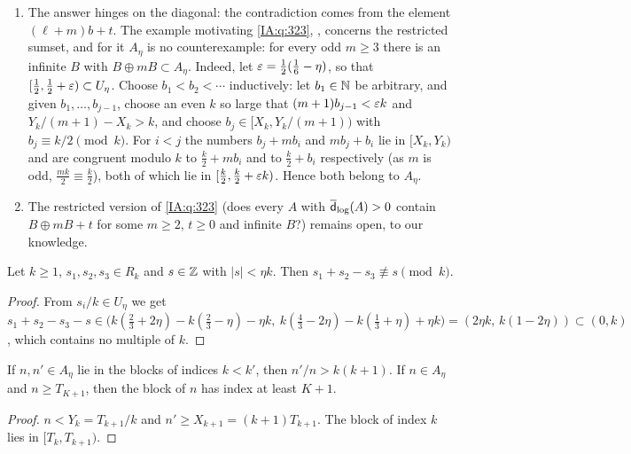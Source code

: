 \begin{remark}\label{IA:rem:323}
\begin{enumerate}[label=(\roman*)]
\item The answer hinges on the diagonal: the contradiction comes from the element $(\ell+m)b+t$.
The example motivating \cref{IA:q:323}, \cite[Example~3.21]{kra2023problems}, concerns the
restricted sumset, and for it $A_\eta$ is no counterexample: for every odd $m\ge3$ there is an
infinite $B$ with $B\oplus mB\subset A_\eta$. Indeed, let $\varepsilon=\frac12(\frac16-\eta)$, so that
$[\frac12,\frac12+\varepsilon)\subset U_\eta$. Choose $b_1<b_2<\cdots$ inductively: let $b_1\in\mathbb{N}$ be
arbitrary, and given $b_1,\dots,b_{j-1}$,
choose an even $k$ so large that $(m+1)b_{j-1}<\varepsilon k$ and $Y_k/(m+1)-X_k>k$, and choose
$b_j\in[X_k,Y_k/(m+1))$ with $b_j\equiv k/2\pmod k$. For $i<j$ the numbers $b_j+mb_i$ and
$mb_j+b_i$ lie in $[X_k,Y_k)$ and are congruent modulo $k$ to $\frac k2+mb_i$ and to
$\frac k2+b_i$ respectively (as $m$ is odd, $\frac{mk}2\equiv\frac k2$), both of which lie in
$[\frac k2,\frac k2+\varepsilon k)$. Hence both belong to $A_\eta$.
\item The restricted version of \cref{IA:q:323} (does every $A$ with $\overline{\mathsf{d}}_{\log}(A)>0$ contain
$B\oplus mB+t$ for some $m\ge2$, $t\ge0$ and infinite $B$?) remains open, to our knowledge.
\end{enumerate}
\end{remark}

\begin{lemma}\label{IA:lem:sumfree}
Let $k\ge1$, $s_1,s_2,s_3\in R_k$ and $s\in\mathbb{Z}$ with $|s|<\eta k$. Then $s_1+s_2-s_3\not\equiv s\pmod k$.
\end{lemma}

\begin{proof}
From $s_i/k\in U_\eta$ we get $s_1+s_2-s_3-s\in\big(k(\frac23+2\eta)-k(\frac23-\eta)-\eta k,\
k(\frac43-2\eta)-k(\frac13+\eta)+\eta k\big)=(2\eta k,\,k(1-2\eta))\subset(0,k)$, which contains no
multiple of $k$.
\end{proof}

\begin{lemma}\label{IA:lem:blocksep}
If $n,n'\in A_\eta$ lie in the blocks of indices $k<k'$, then $n'/n>k(k+1)$. If $n\in A_\eta$ and
$n\ge T_{K+1}$, then the block of $n$ has index at least $K+1$.
\end{lemma}

\begin{proof}
$n<Y_k=T_{k+1}/k$ and $n'\ge X_{k+1}=(k+1)T_{k+1}$. The block of index $k$ lies in $[T_k,T_{k+1})$.
\end{proof}

